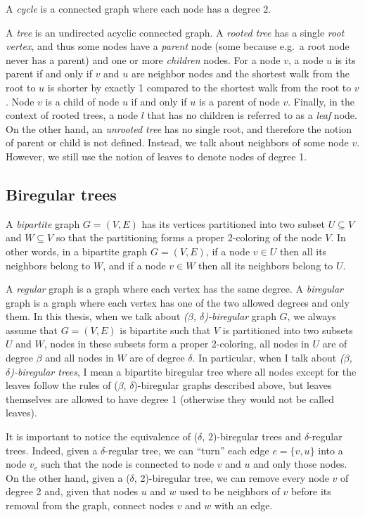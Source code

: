 A \emph{cycle} is a connected graph where each node has a degree 2.

A \emph{tree} is an undirected acyclic connected graph. A \emph{rooted tree}
has a single \emph{root vertex}, and thus some nodes have a \emph{parent} node
(some because e.g.\ a root node never has a parent) and one or more \emph{children}
nodes. For a node $v$, a node $u$ is its parent if and only if $v$ and $u$ are
neighbor nodes and the shortest walk from the root to $u$ is shorter by exactly
1 compared to the shortest walk from the root to $v$. Node $v$ is a child of node
$u$ if and only if $u$ is a parent of node $v$. Finally, in the context of rooted trees,
a node $l$ that has no children is referred to as a \emph{leaf} node.
On the other hand, an \emph{unrooted tree} has no single root, and therefore the notion of parent
or child is not defined. Instead, we talk about neighbors of some node $v$. However, we 
still use the notion of leaves to denote nodes of degree 1.

\subsection{Biregular trees}
\label{subsection:biregular-trees}

A \emph{bipartite} graph $G = (V, E)$ has its vertices partitioned into two
subset $U \subseteq V$ and $W \subseteq V$ so that the partitioning forms
a proper 2-coloring of the node $V$. In other words, in a bipartite graph $G = (V, E)$,
if a node $v \in U$ then all its neighbors belong to $W$, and if a node $v \in W$
then all its neighbors belong to $U$.

A \emph{regular} graph is a graph where each vertex has the same degree.
A \emph{biregular} graph is a graph where each vertex has one of the two
allowed degrees and only them. In this thesis, when we talk about
\emph{($\beta$, $\delta$)-biregular} graph $G$, we always assume that 
$G = (V, E)$ is bipartite such that $V$ is partitioned into two
subsets $U$ and $W$, nodes in these subsets form a proper 2-coloring,
all nodes in $U$ are of degree $\beta$ and all nodes in $W$ are of
degree $\delta$. In particular, when I talk about \emph{($\beta$, $\delta$)-biregular trees},
I mean a bipartite biregular tree where all nodes except for the leaves
follow the rules of ($\beta$, $\delta$)-biregular graphs described above,
but leaves themselves are allowed to have degree 1 (otherwise they would not be
called leaves).

It is important to notice the equivalence of ($\delta$, 2)-biregular trees
and $\delta$-regular trees. Indeed, given a $\delta$-regular tree, we can
``turn'' each edge $e = \{v, u\}$ into a node $v_e$ such that the node is
connected to node $v$ and $u$ and only those nodes. On the other hand,
given a ($\delta$, 2)-biregular tree, we can remove every node $v$ of degree
2 and, given that nodes $u$ and $w$ used to be neighbors of $v$ before its
removal from the graph, connect nodes $v$ and $w$ with an edge.

